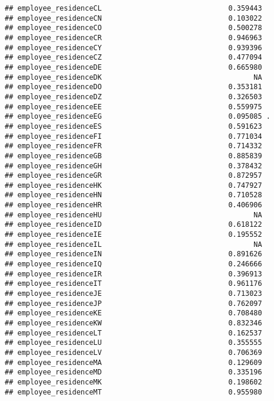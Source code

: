 \documentclass[
]{article}
\begin{document}
\begin{verbatim}
## employee_residenceCL                              0.359443    
## employee_residenceCN                              0.103022    
## employee_residenceCO                              0.500278    
## employee_residenceCR                              0.946963    
## employee_residenceCY                              0.939396    
## employee_residenceCZ                              0.477094    
## employee_residenceDE                              0.665980    
## employee_residenceDK                                    NA    
## employee_residenceDO                              0.353181    
## employee_residenceDZ                              0.326503    
## employee_residenceEE                              0.559975    
## employee_residenceEG                              0.095085 .  
## employee_residenceES                              0.591623    
## employee_residenceFI                              0.771034    
## employee_residenceFR                              0.714332    
## employee_residenceGB                              0.885839    
## employee_residenceGH                              0.378432    
## employee_residenceGR                              0.872957    
## employee_residenceHK                              0.747927    
## employee_residenceHN                              0.710528    
## employee_residenceHR                              0.406906    
## employee_residenceHU                                    NA    
## employee_residenceID                              0.618122    
## employee_residenceIE                              0.195552    
## employee_residenceIL                                    NA    
## employee_residenceIN                              0.891626    
## employee_residenceIQ                              0.246666    
## employee_residenceIR                              0.396913    
## employee_residenceIT                              0.961176    
## employee_residenceJE                              0.713023    
## employee_residenceJP                              0.762097    
## employee_residenceKE                              0.708480    
## employee_residenceKW                              0.832346    
## employee_residenceLT                              0.162537    
## employee_residenceLU                              0.355555    
## employee_residenceLV                              0.706369    
## employee_residenceMA                              0.129609    
## employee_residenceMD                              0.335196    
## employee_residenceMK                              0.198602    
## employee_residenceMT                              0.955980    

\end{verbatim}
\end{document}
